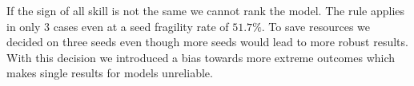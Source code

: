 If the sign of all skill is not the same we cannot rank the model. The rule applies in only 3 cases even at a seed fragility rate of $51.7\%$. To save resources we decided on three seeds even though more seeds would lead to more robust results.
With this decision we introduced a bias towards more extreme outcomes which makes single results for models unreliable.
%
%
%
%


